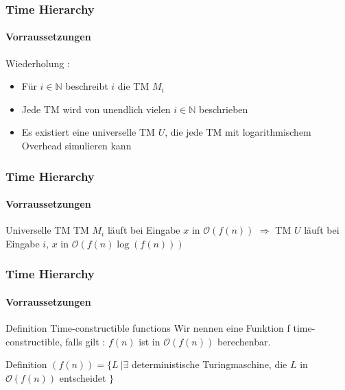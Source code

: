 \begin{frame}
	\frametitle{Time Hierarchy}
	\framesubtitle{Vorraussetzungen}
	Wiederholung :
	\begin{itemize}[<+->]
		\item Für $i\in \mathbb{N}$ beschreibt $i$ die TM $M_i$
		\item Jede TM wird von unendlich vielen $i\in \mathbb{N}$ beschrieben
		\item Es existiert eine universelle TM $U$, die jede TM mit logarithmischem Overhead 					simulieren kann
	\end{itemize}
\end{frame}
\begin{frame}
	\frametitle{Time Hierarchy}
	\framesubtitle{Vorraussetzungen}
	\begin{KITexampleblock}{Universelle TM}
	TM $M_i$ läuft bei Eingabe $x$ in $\mathcal{O}(f(n))$
	$\Rightarrow$ TM $U$ läuft bei Eingabe $i$, $x$ in $\mathcal{O}(f(n)\log(f(n)))$
	\end{KITexampleblock}
\end{frame}
\begin{frame}
	\frametitle{Time Hierarchy}
	\framesubtitle{Vorraussetzungen}
	\begin{KITinfoblock}{Definition Time-constructible functions}
		Wir nennen eine Funktion f time-constructible, falls gilt : \newline
		$f(n)$ ist in $\mathcal{O}(f(n))$ berechenbar. 
	\end{KITinfoblock}
	
	\bigskip
	\pause	
	
	\begin{KITinfoblock}{Definition \DTIME }
		\DTIME$(f(n)) = \lbrace L \ \vert \exists$ deterministische Turingmaschine,
		 die $L$ in $\mathcal{O}(f(n))$ entscheidet $\rbrace$
	\end{KITinfoblock}
\end{frame}
